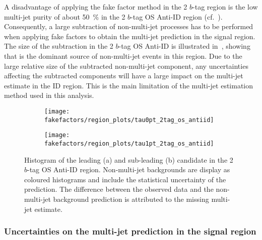 A disadvantage of applying the fake factor method in the 2 $b$-tag
region is the low multi-jet purity of about \SI{50}{\percent} in the 2
$b$-tag OS Anti-ID region (cf.\
). Consequently, a large subtraction of
non-multi-jet processes has to be performed when applying fake factors
to obtain the multi-jet prediction in the signal region.  The size of
the subtraction in the 2 $b$-tag OS Anti-ID is illustrated
in~, showing that \ttbarFakes is the
dominant source of non-multi-jet events in this region. Due to the
large relative size of the subtracted non-multi-jet component, any
uncertainties affecting the subtracted components will have a large
impact on the multi-jet estimate in the ID region. This is the main
limitation of the multi-jet estimation method used in this analysis.

\begin{figure}[htbp]
  \centering

  \begin{subfigure}{0.49\textwidth}
    \texttt{[image: fakefactors/region\_plots/tau0pt\_2tag\_os\_antiid]}
    \subcaption{}
  \end{subfigure}
  \begin{subfigure}{0.49\textwidth}
    \texttt{[image: fakefactors/region\_plots/tau1pt\_2tag\_os\_antiid]}
    \subcaption{}
  \end{subfigure}

  \caption{Histogram of the leading (a) and sub-leading (b) \tauhadvis
    candidate \pT in the 2 $b$-tag OS Anti-ID region. Non-multi-jet
    backgrounds are display as coloured histograms and include the
    statistical uncertainty of the prediction. The difference between
    the observed data and the non-multi-jet background prediction is
    attributed to the missing multi-jet estimate.}%
  \label{fig:mjfakes_2tag_os_antiid}
\end{figure}


\subsubsection{Uncertainties on the multi-jet prediction in the
  \hadhad signal region}

%


